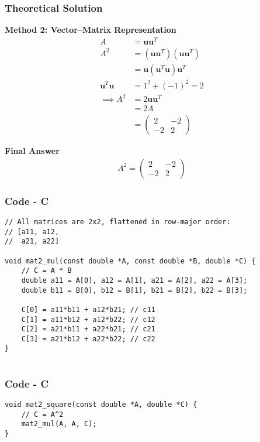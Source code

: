 \documentclass{beamer}
\theoremstyle{remark}
\newcommand{\myvec}[1]{\ensuremath{\begin{pmatrix}#1\end{pmatrix}}}
\let\vec\mathbf
\numberwithin{equation}{section}
\begin{document}
\begin{frame}
\frametitle{Theoretical Solution}
\textbf{Method 2: Vector--Matrix Representation}
\begin{align}
A &= \vec{u}\vec{u}^T \\
A^2 &= (\vec{u}\vec{u}^T)(\vec{u}\vec{u}^T) \\
&= \vec{u}(\vec{u}^T \vec{u})\vec{u}^T \\
\vec{u}^T \vec{u} &= 1^2 + (-1)^2 = 2 \\
\implies A^2 &= 2\vec{u}\vec{u}^T \\
&= 2A \\
&= \myvec{2 & -2 \\ -2 & 2}
\end{align}

\textbf{Final Answer}
\begin{align}
A^2 = \myvec{2 & -2 \\ -2 & 2}
\end{align}


\end{frame}






\begin{frame}[fragile]
    \frametitle{Code - C}
    \begin{lstlisting}
// All matrices are 2x2, flattened in row-major order:
// [a11, a12,
//  a21, a22]

void mat2_mul(const double *A, const double *B, double *C) {
    // C = A * B
    double a11 = A[0], a12 = A[1], a21 = A[2], a22 = A[3];
    double b11 = B[0], b12 = B[1], b21 = B[2], b22 = B[3];

    C[0] = a11*b11 + a12*b21; // c11
    C[1] = a11*b12 + a12*b22; // c12
    C[2] = a21*b11 + a22*b21; // c21
    C[3] = a21*b12 + a22*b22; // c22
}


    \end{lstlisting}
    \end{frame}

    \begin{frame}[fragile]
    \frametitle{Code - C}
    \begin{lstlisting}
void mat2_square(const double *A, double *C) {
    // C = A^2
    mat2_mul(A, A, C);
}

\end{lstlisting}
\end{frame}
\end{document}
